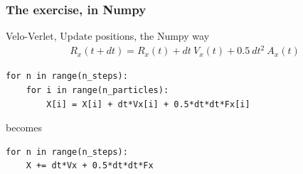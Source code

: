 % 
% 
% 
% 
% 
% 
% 

\begin{frame}[fragile]

    \frametitle{The exercise, in Numpy}

    Velo-Verlet, Update positions, the Numpy way
    \begin{align*}
        R_x(t + dt) = R_x(t) + dt\ V_x(t) + 0.5\ dt^2\ A_x(t) \label{eq:position_x}
    \end{align*}


    \bigskip

\begin{lstlisting}
for n in range(n_steps):
    for i in range(n_particles):
        X[i] = X[i] + dt*Vx[i] + 0.5*dt*dt*Fx[i]
\end{lstlisting}

becomes

\begin{lstlisting}
for n in range(n_steps):
    X += dt*Vx + 0.5*dt*dt*Fx
\end{lstlisting}

\end{frame}









